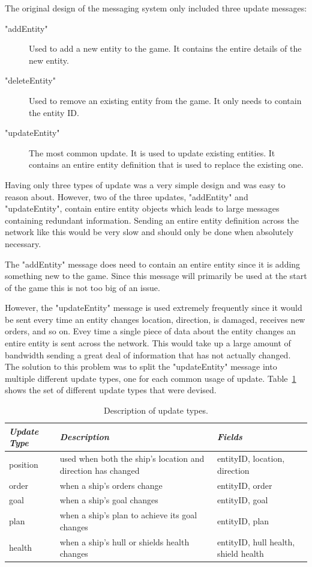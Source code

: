 The original design of the messaging system only included three update messages:

\begin{description}
	\item["addEntity"] Used to add a new entity to the game. It contains the entire details of the new entity.
	\item["deleteEntity"] Used to remove an existing entity from the game. It only needs to contain the entity ID.
	\item["updateEntity"] The most common update. It is used to update existing entities. It contains an entire entity definition that is used to replace the existing one.
\end{description}

Having only three types of update was a very simple design and was easy to reason about. However, two of the three updates, "addEntity" and "updateEntity", contain entire entity objects which leads to large messages containing redundant information. Sending an entire entity definition across the network like this would be very slow and should only be done when absolutely necessary.

The "addEntity" message does need to contain an entire entity since it is adding something new to the game. Since this message will primarily be used at the start of the game this is not too big of an issue.

However, the "updateEntity" message is used extremely frequently since it would be sent every time an entity changes location, direction, is damaged, receives new orders, and so on. Evey time a single piece of data about the entity changes an entire entity is sent across the network. This would take up a large amount of bandwidth sending a great deal of information that has not actually changed. The solution to this problem was to split the "updateEntity" message into multiple different update types, one for each common usage of update. Table~\ref{tab:updateMessageTypes} shows the set of different update types that were devised.

\begin{table}
    \begin{tabular}{p{5em} p{15em} p{6em}}
    \toprule
    \emph{Update Type} & \emph{Description} & \emph{Fields} \\
    \midrule
    position & used when both the ship's location and direction has changed & entityID, location, direction \\
    order & when a ship's orders change & entityID, order \\
    goal & when a ship's goal changes & entityID, goal \\
    plan & when a ship's plan to achieve its goal changes & entityID, plan \\
    health & when a ship's hull or shields health changes & entityID, hull health, shield health \\ 
    \bottomrule
    \end{tabular}
    	\vspace{1em}
	\caption[Message update types]{Description of update types.}
	\label{tab:updateMessageTypes}
\end{table}

